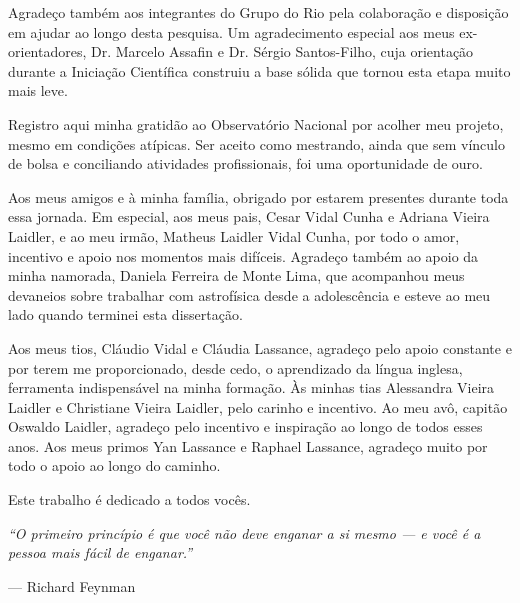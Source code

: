 \documentclass[msc]{on} %
\begin{document}
Agradeço também aos integrantes do Grupo do Rio pela colaboração e disposição em ajudar ao longo desta pesquisa. Um agradecimento especial aos meus ex-orientadores, Dr. Marcelo Assafin e Dr. Sérgio Santos-Filho, cuja orientação durante a Iniciação Científica construiu a base sólida que tornou esta etapa muito mais leve.

Registro aqui minha gratidão ao Observatório Nacional por acolher meu projeto, mesmo em condições atípicas. Ser aceito como mestrando, ainda que sem vínculo de bolsa e conciliando atividades profissionais, foi uma oportunidade de ouro.

Aos meus amigos e à minha família, obrigado por estarem presentes durante toda essa jornada. Em especial, aos meus pais, Cesar Vidal Cunha e Adriana Vieira Laidler, e ao meu irmão, Matheus Laidler Vidal Cunha, por todo o amor, incentivo e apoio nos momentos mais difíceis. Agradeço também ao apoio da minha namorada, Daniela Ferreira de Monte Lima, que acompanhou meus devaneios sobre trabalhar com astrofísica desde a adolescência e esteve ao meu lado quando terminei esta dissertação.

Aos meus tios, Cláudio Vidal e Cláudia Lassance, agradeço pelo apoio constante e por terem me proporcionado, desde cedo, o aprendizado da língua inglesa, ferramenta indispensável na minha formação. Às minhas tias Alessandra Vieira Laidler e Christiane Vieira Laidler, pelo carinho e incentivo. Ao meu avô, capitão Oswaldo Laidler, agradeço pelo incentivo e inspiração ao longo de todos esses anos. Aos meus primos Yan Lassance e Raphael Lassance, agradeço muito por todo o apoio ao longo do caminho.

Este trabalho é dedicado a todos vocês.


\cleardoublepage
\thispagestyle{plain}




\pagestyle{empty} %

\null\vfill\vfill\vfill\vfill\vfill\vfill\vfill %

\begin{flushright}
{\normalsize 

\textit{``O primeiro princípio é que você não deve enganar a si mesmo --- e você é a pessoa mais fácil de enganar.''}

--- Richard Feynman

}
\end{flushright}
\end{document}

